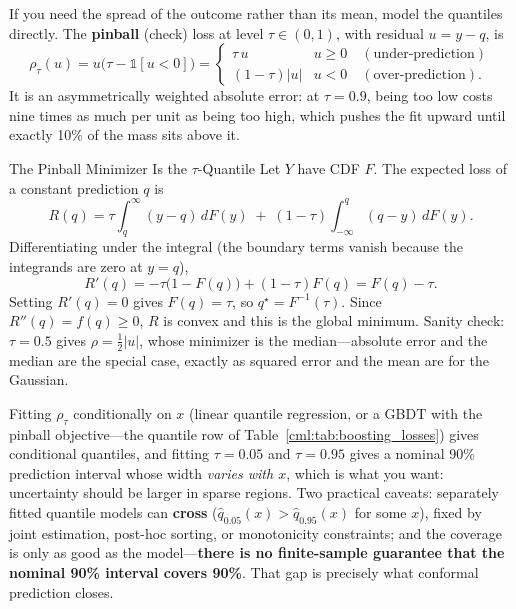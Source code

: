If you need the spread of the outcome rather than its mean, model the quantiles directly. The \textbf{pinball} (check) loss at level $\tau \in (0,1)$, with residual $u = y - q$, is
\begin{equation}
\rho_\tau(u) = u\big(\tau - \mathds{1}[u < 0]\big) =
\begin{cases}
\tau\, u & u \ge 0 \quad (\text{under-prediction}) \\
(1-\tau)|u| & u < 0 \quad (\text{over-prediction}).
\end{cases}
\end{equation}
It is an asymmetrically weighted absolute error: at $\tau = 0.9$, being too low costs nine times as much per unit as being too high, which pushes the fit upward until exactly 10\% of the mass sits above it.

\begin{mathresult}{The Pinball Minimizer Is the $\tau$-Quantile}
Let $Y$ have CDF $F$. The expected loss of a constant prediction $q$ is
\begin{equation}
R(q) = \tau\!\int_q^\infty (y-q)\,dF(y) \;+\; (1-\tau)\!\int_{-\infty}^q (q-y)\,dF(y) .
\end{equation}
Differentiating under the integral (the boundary terms vanish because the integrands are zero at $y=q$),
\begin{equation}
R'(q) = -\tau\big(1 - F(q)\big) + (1-\tau)F(q) = F(q) - \tau .
\end{equation}
Setting $R'(q) = 0$ gives $F(q) = \tau$, so $q^\star = F^{-1}(\tau)$. Since $R''(q) = f(q) \ge 0$, $R$ is convex and this is the global minimum. Sanity check: $\tau = 0.5$ gives $\rho = \tfrac{1}{2}|u|$, whose minimizer is the median---absolute error and the median are the special case, exactly as squared error and the mean are for the Gaussian.
\end{mathresult}

Fitting $\rho_\tau$ conditionally on $x$ (linear quantile regression, or a GBDT with the pinball objective---the quantile row of Table~\ref{cml:tab:boosting_losses}) gives conditional quantiles, and fitting $\tau = 0.05$ and $\tau = 0.95$ gives a nominal 90\% prediction interval whose width \textit{varies with $x$}, which is what you want: uncertainty should be larger in sparse regions. Two practical caveats: separately fitted quantile models can \textbf{cross} ($\hat q_{0.05}(x) > \hat q_{0.95}(x)$ for some $x$), fixed by joint estimation, post-hoc sorting, or monotonicity constraints; and the coverage is only as good as the model---\textbf{there is no finite-sample guarantee that the nominal 90\% interval covers 90\%}. That gap is precisely what conformal prediction closes.

